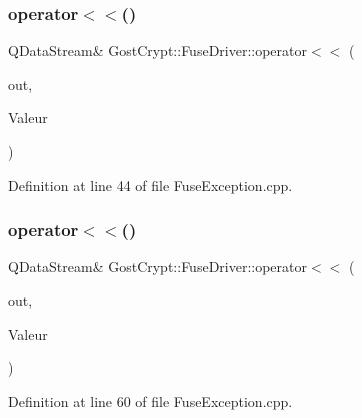 \subsubsection{\texorpdfstring{operator$<$$<$()}{operator<<()}\hspace{0.1cm}{\footnotesize\ttfamily [3/6]}}
{\footnotesize\ttfamily Q\+Data\+Stream\& Gost\+Crypt\+::\+Fuse\+Driver\+::operator$<$$<$ (\begin{DoxyParamCaption}\item[{Q\+Data\+Stream \&}]{out,  }\item[{const \hyperlink{class_gost_crypt_1_1_fuse_driver_1_1_fuse_control_file_access_failed}{Gost\+Crypt\+::\+Fuse\+Driver\+::\+Fuse\+Control\+File\+Access\+Failed} \&}]{Valeur }\end{DoxyParamCaption})}



Definition at line 44 of file Fuse\+Exception.\+cpp.

\mbox{\label{namespace_gost_crypt_1_1_fuse_driver_a4ccdc0758c3f1a31fc9f7c5ee8d12fbe}} 
\subsubsection{\texorpdfstring{operator$<$$<$()}{operator<<()}\hspace{0.1cm}{\footnotesize\ttfamily [4/6]}}
{\footnotesize\ttfamily Q\+Data\+Stream\& Gost\+Crypt\+::\+Fuse\+Driver\+::operator$<$$<$ (\begin{DoxyParamCaption}\item[{Q\+Data\+Stream \&}]{out,  }\item[{const \hyperlink{class_gost_crypt_1_1_fuse_driver_1_1_fuse_fork_failed}{Gost\+Crypt\+::\+Fuse\+Driver\+::\+Fuse\+Fork\+Failed} \&}]{Valeur }\end{DoxyParamCaption})}



Definition at line 60 of file Fuse\+Exception.\+cpp.

\mbox{\label{namespace_gost_crypt_1_1_fuse_driver_ac7e34e8caa7244810c4a0f3605df29ec}} 
